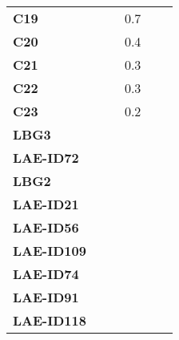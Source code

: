 \begin{tabular}{lrrrrl}
\textbf{C19      } &           &              &      0.7 &             &        \\
\textbf{C20      } &           &              &      0.4 &             &        \\
\textbf{C21      } &           &              &      0.3 &             &        \\
\textbf{C22      } &           &              &      0.3 &             &        \\
\textbf{C23      } &           &              &      0.2 &             &        \\
\textbf{LBG3     } &           &              &          &             &        \\
\textbf{LAE-ID72 } &           &              &          &             &        \\
\textbf{LBG2     } &           &              &          &             &        \\
\textbf{LAE-ID21 } &           &              &          &             &        \\
\textbf{LAE-ID56 } &           &              &          &             &        \\
\textbf{LAE-ID109} &           &              &          &             &        \\
\textbf{LAE-ID74 } &           &              &          &             &        \\
\textbf{LAE-ID91 } &           &              &          &             &        \\
\textbf{LAE-ID118} &           &              &          &             &        \\
\bottomrule
\end{tabular}
